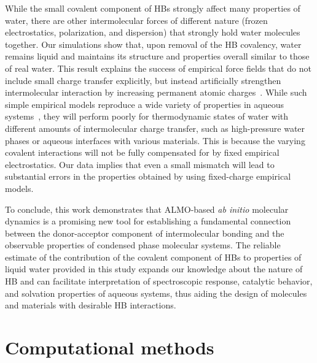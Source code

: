 \documentclass[aps,prl,reprint,amsmath,amssymb]{revtex4-1}
\begin{document}
While the small covalent component of HBs strongly affect many properties of water, there are other intermolecular forces of different nature (frozen electrostatics, polarization, and dispersion) that strongly hold water molecules together. 
Our simulations show that, upon removal of the HB covalency, water remains liquid and maintains its structure and properties overall similar to those of real water. 
This result explains the success of empirical force fields that do not include small charge transfer explicitly, but instead artificially strengthen intermolecular interaction by increasing permanent atomic charges~\cite{rick2016polarizable}. 
While such simple empirical models reproduce a wide variety of properties in aqueous systems~\cite{vega2011simulating}, they will perform poorly for thermodynamic states of water with different amounts of intermolecular charge transfer, such as high-pressure water phases or aqueous interfaces with various materials. 
This is because the varying covalent interactions will not be fully compensated for by fixed empirical electrostatics.
Our data implies that even a small mismatch will lead to substantial errors in the properties obtained by using fixed-charge empirical models.

To conclude, this work demonstrates that ALMO-based \emph{ab initio} molecular dynamics is a promising new tool for establishing a fundamental connection between the donor-acceptor component of intermolecular bonding and the observable properties of condensed phase molecular systems. 
The reliable estimate of the contribution of the covalent component of HBs to properties of liquid water provided in this study expands our knowledge about the nature of HB and can facilitate interpretation of spectroscopic response, catalytic behavior, and solvation properties of aqueous systems, thus aiding the design of molecules and materials with desirable HB interactions. 
 
\section{Computational methods}
\end{document}
